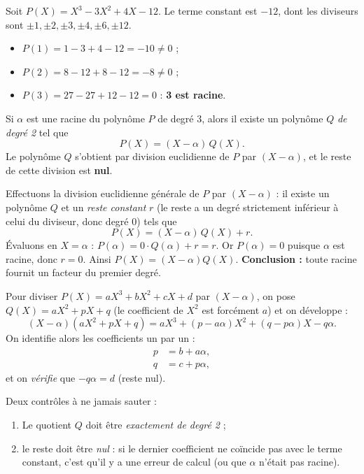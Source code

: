 \documentclass[11pt]{article}
\newcommand{\cle}[1]{{\popxbold\color{popdark}#1}}
\newcounter{popsec}
\newcounter{popsub}
\newcommand{\courssub}[1]{%
  \stepcounter{popsub}%
  \par\vspace{9pt}\noindent{\popxbold\fontsize{11.5}{13}\selectfont\color{popink}{\color{poporange}\thepopsec.\thepopsub}\hspace{6pt}#1}\par\nopagebreak\vspace{4pt}
}
\begin{document}
\begin{exemplebox}
Soit $P(X)=X^3-3X^2+4X-12$. Le terme constant est $-12$, dont les diviseurs sont $\pm1,\pm2,\pm3,\pm4,\pm6,\pm12$.
\begin{itemize}
\item $P(1)=1-3+4-12=-10 \neq 0$ ;
\item $P(2)=8-12+8-12=-8 \neq 0$ ;
\item $P(3)=27-27+12-12=0$ : \textbf{3 est racine}.
\end{itemize}
\end{exemplebox}

\courssub{La division euclidienne par $(X-\alpha)$}

\begin{propriete}
Si $\alpha$ est une racine du polynôme $P$ de degré 3, alors il existe un polynôme $Q$ \emph{de degré 2} tel que
\[ P(X) = (X-\alpha)\,Q(X). \]
Le polynôme $Q$ s'obtient par \cle{division euclidienne} de $P$ par $(X-\alpha)$, et le reste de cette division est \textbf{nul}.
\end{propriete}

\begin{experience}
Effectuons la division euclidienne générale de $P$ par $(X-\alpha)$ : il existe un polynôme $Q$ et un \emph{reste constant} $r$ (le reste a un degré strictement inférieur à celui du diviseur, donc degré 0) tels que
\[ P(X) = (X-\alpha)\,Q(X) + r. \]
Évaluons en $X=\alpha$ : $P(\alpha) = 0 \cdot Q(\alpha) + r = r$. Or $P(\alpha)=0$ puisque $\alpha$ est racine, donc $r=0$. Ainsi $P(X)=(X-\alpha)Q(X)$. \textbf{Conclusion :} toute racine fournit un facteur du premier degré.
\end{experience}

\begin{methode}
Pour diviser $P(X)=aX^3+bX^2+cX+d$ par $(X-\alpha)$, on pose $Q(X)=aX^2+pX+q$ (le coefficient de $X^2$ est forcément $a$) et on développe :
\[ (X-\alpha)(aX^2+pX+q) = aX^3 + (p-a\alpha)X^2 + (q-p\alpha)X - q\alpha. \]
On identifie alors les coefficients un par un :
\begin{align*}
p &= b + a\alpha,\\
q &= c + p\alpha,
\end{align*}
et on \emph{vérifie} que $-q\alpha = d$ (reste nul).
\end{methode}

\begin{attention}
Deux contrôles à ne jamais sauter :
\begin{enumerate}
\item Le quotient $Q$ doit être \emph{exactement de degré 2} ;
\item le reste doit être \emph{nul} : si le dernier coefficient ne coïncide pas avec le terme constant, c'est qu'il y a une erreur de calcul (ou que $\alpha$ n'était pas racine).
\end{enumerate}
\end{attention}
\end{document}

